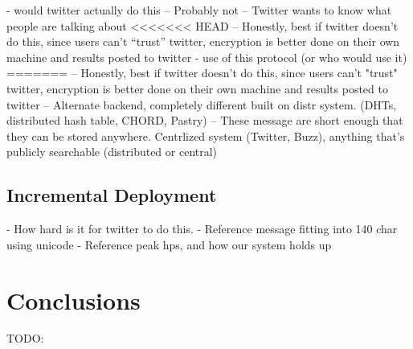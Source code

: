 \documentclass{acm_proc_article-sp}
\begin{document}
- would twitter actually do this
	-- Probably not
	-- Twitter wants to know what people are talking about
<<<<<<< HEAD
	-- Honestly, best if twitter doesn't do this, since users can't ``trust'' twitter, encryption is better done on their own machine and results posted to twitter
- use of this protocol (or who would use it)
=======
	-- Honestly, best if twitter doesn't do this, since users can't "trust" twitter, encryption is better done on their own machine and results posted to twitter
		-- Alternate backend, completely different built on distr system. (DHTs, distributed hash table, CHORD, Pastry)
		-- These message are short enough that they can be stored anywhere. Centrlized system (Twitter, Buzz), anything that's publicly searchable (distributed or central)
		
\subsection{Incremental Deployment}

- How hard is it for twitter to do this. 
- Reference message fitting into 140 char using unicode
- Reference peak hps, and how our system holds up

\section{Conclusions}

TODO:




\balancecolumns{}
\end{document}
